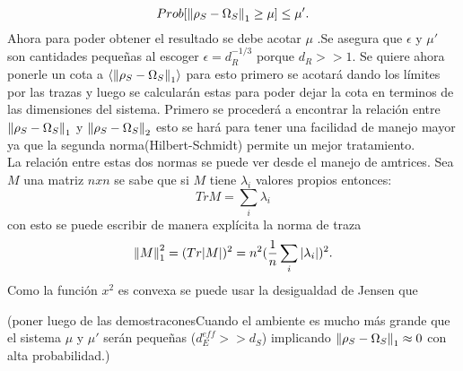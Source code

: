 \begin{equation}
Prob[\norm{\rho_{S} -\Omega_{S}}_{1} \ge \mu] \le \mu'.
\end{equation}
Ahora para poder obtener el resultado se debe acotar $\mu$ .Se asegura que $\epsilon$ y $\mu'$ son cantidades pequeñas al escoger $\epsilon=d_{R}^{-1/3}$ porque $d_{R}>>1$. Se quiere ahora ponerle un cota a $\langle \norm{\rho_{S} -\Omega_{S}}_{1} \rangle$ para esto primero se acotará dando los límites por las trazas y luego se calcularán estas para poder dejar la cota en terminos de las dimensiones del sistema. Primero se procederá a encontrar la relación entre $\norm{\rho_{S} -\Omega_{S}}_{1}$ y $\norm{\rho_{S} -\Omega_{S}}_{2}$ esto se hará para tener una facilidad de manejo mayor ya que la segunda norma(Hilbert-Schmidt) permite un mejor tratamiento.\\
La relación entre estas dos normas se puede ver desde el manejo de amtrices. Sea $M$ una matriz $nxn$ se sabe que si $M$ tiene $\lambda_{i}$ valores propios entonces:
\begin{equation}
Tr M= \sum_{i} \lambda_{i} 
\end{equation}
con esto se puede escribir de manera explícita la norma de traza 
\begin{equation}
\norm{M}_{1}^2=(Tr|M|)^{2}=n^{2} (\frac{1}{n}\sum_{i} |\lambda_{i}|)^{2}.
\end{equation}
Como la función $x^{2}$ es convexa se puede usar la desigualdad de Jensen que	



(poner luego de las demostraconesCuando  el ambiente es mucho más grande que el sistema $\mu$ y $\mu'$ serán pequeñas ($d_{E}^{eff}>>d_{S}$) implicando $\norm{\rho_{S} -\Omega_{S}}_{1} \approx 0$ con alta probabilidad.)












